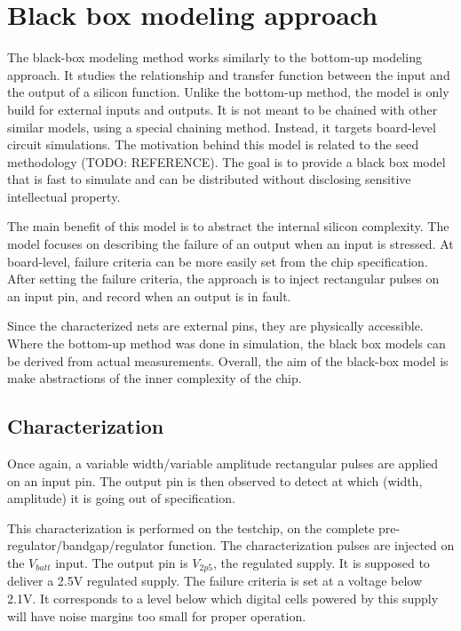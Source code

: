 \section{Black box modeling approach}

The black-box modeling method works similarly to the bottom-up modeling approach.
It studies the relationship and transfer function between the input and the output of a silicon function.
Unlike the bottom-up method, the model is only build for external inputs and outputs.
It is not meant to be chained with other similar models, using a special chaining method.
Instead, it targets board-level circuit simulations.
The motivation behind this model is related to the \gls{seed} methodology (TODO: REFERENCE).
The goal is to provide a black box model that is fast to simulate and can be distributed without disclosing sensitive intellectual property.

The main benefit of this model is to abstract the internal silicon complexity.
The model focuses on describing the failure of an output when an input is stressed.
At board-level, failure criteria can be more easily set from the chip specification.
After setting the failure criteria, the approach is to inject rectangular pulses on an input pin, and record when an output is in fault.

Since the characterized nets are external pins, they are physically accessible.
Where the bottom-up method was done in simulation, the black box models can be derived from actual measurements.
Overall, the aim of the black-box model is make abstractions of the inner complexity of the chip.

\subsection{Characterization}

Once again, a variable width/variable amplitude rectangular pulses are applied on an input pin.
The output pin is then observed to detect at which (width, amplitude) it is going out of specification.

This characterization is performed on the testchip, on the complete pre-regulator/bandgap/regulator function.
The characterization pulses are injected on the $V_{batt}$ input.
The output pin is $V_{2p5}$, the regulated supply.
It is supposed to deliver a 2.5V regulated supply.
The failure criteria is set at a voltage below 2.1V.
It corresponds to a level below which digital cells powered by this supply will have noise margins too small for proper operation.

